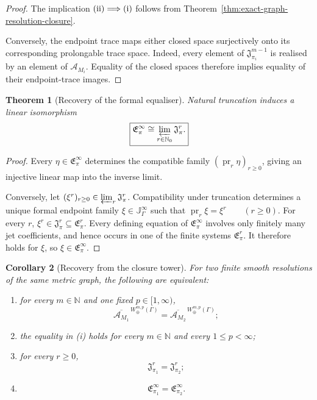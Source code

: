 \documentclass[11pt]{article}
\theoremstyle{plain}
\newtheorem{theorem}{Theorem}[section]
\newtheorem{corollary}[theorem]{Corollary}
\theoremstyle{definition}
\begin{document}
\begin{proof}
The implication \(\textup{(ii)} \Longrightarrow \textup{(i)}\) follows from
Theorem~\ref{thm:exact-graph-resolution-closure}.

Conversely, the endpoint trace maps either closed space surjectively
onto its corresponding prolongable trace space. Indeed, every element
of \(\mathfrak J_{\pi_i}^{m-1}\) is realised by an element of
\(\mathscr A_{M_i}\). Equality of the closed spaces therefore implies
equality of their endpoint-trace images.
\end{proof}



\begin{theorem}[Recovery of the formal equaliser]
\label{thm:recovery-formal-equaliser}
Natural truncation induces a linear isomorphism
\[
  \boxed{
  \mathfrak E_\pi^\infty
  \cong
  \varprojlim_{r\in\mathbb N_0}
  \mathfrak J_\pi^r.
  }
\]
\end{theorem}

\begin{proof}
Every \(\eta\in\mathfrak E_\pi^\infty\) determines the compatible family
\(\left( \operatorname{pr}_r\eta \right)_{r\geq0}\),
giving an injective linear map into the inverse limit.

Conversely, let
\((\xi^r)_{r\geq0} \in \varprojlim_r\mathfrak J_\pi^r\).
Compatibility under truncation determines a unique formal endpoint
family \(\xi\in\mathbb J_\Gamma^\infty\) such that
\(\operatorname{pr}_r\xi=\xi^r \qquad (r\geq0)\).
For every \(r\),
\(\xi^r \in \mathfrak J_\pi^r \subseteq \mathfrak E_\pi^r\).
Every defining equation of
\(\mathfrak E_\pi^\infty\) involves only finitely many jet
coefficients, and hence occurs in one of the finite systems
\(\mathfrak E_\pi^r\). It therefore holds for \(\xi\), so
\(\xi\in\mathfrak E_\pi^\infty\).
\end{proof}

\begin{corollary}[Recovery from the closure tower]
\label{cor:recovery-from-graph-closure-tower}
For two finite smooth resolutions of the same metric graph, the
following are equivalent:

\begin{enumerate}[label=\textup{(\roman*)}]
  \item for every \(m\in\mathbb N\) and one fixed
        \(p\in[1,\infty)\),
        \[
          \overline{\mathscr A_{M_1}}^{\,W_\oplus^{m,p}(\Gamma)}
          =
          \overline{\mathscr A_{M_2}}^{\,W_\oplus^{m,p}(\Gamma)};
        \]

  \item the equality in \textup{(i)} holds for every
        \(m\in\mathbb N\) and every \(1\leq p<\infty\);

  \item for every \(r\geq0\),
        \[
          \mathfrak J_{\pi_1}^r
          =
          \mathfrak J_{\pi_2}^r;
        \]

  \item
        \[
          \mathfrak E_{\pi_1}^\infty
          =
          \mathfrak E_{\pi_2}^\infty.
        \]
\end{enumerate}
\end{corollary}
\end{document}
